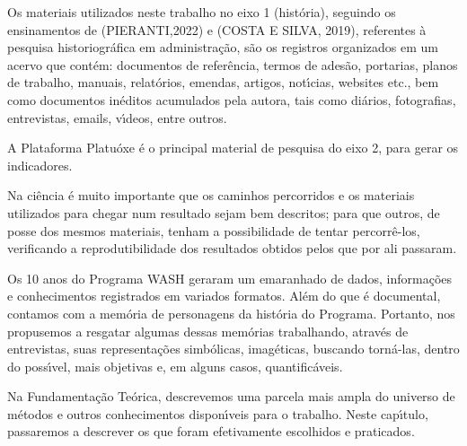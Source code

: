 \documentclass[
12pt,		%
openright,	%
twoside,  %
a4paper,			%
chapter=TITLE,		%
english,			%
french,				%
spanish,			%
brazil				%
]{USPSC-classe/USPSC}
\begin{document}
Os materiais utilizados neste trabalho no eixo 1 (hist\'oria), seguindo os ensinamentos de (PIERANTI,2022) e (COSTA E SILVA, 2019), referentes \`a pesquisa historiogr\'afica em administra\c{c}\~ao,  s\~ao os registros organizados em um acervo que cont\'em: documentos de refer\^encia, termos de ades\~ao, portarias, planos de trabalho, manuais, relat\'orios, emendas, artigos, not\'{\i}cias, websites etc., bem como documentos in\'editos acumulados pela autora, tais como di\'arios, fotografias, entrevistas, emails, v\'{\i}deos, entre outros.









A Plataforma Platu\'oxe \'e o principal material de pesquisa do eixo 2, para gerar os indicadores.









Na ci\^encia \'e muito importante que os caminhos percorridos e os materiais utilizados para chegar num resultado sejam bem descritos; para que outros, de posse dos mesmos materiais, tenham a possibilidade de tentar percorr\^e-los, verificando a reprodutibilidade dos resultados obtidos pelos que por ali passaram.









Os 10 anos do Programa WASH geraram um emaranhado de dados, informa\c{c}\~oes e conhecimentos registrados em variados formatos. Al\'em do que \'e documental, contamos com a mem\'oria de personagens da hist\'oria do Programa. Portanto, nos propusemos a resgatar algumas dessas mem\'orias trabalhando, atrav\'es de entrevistas, suas representa\c{c}\~oes simb\'olicas, imag\'eticas, buscando torn\'a-las, dentro do poss\'{\i}vel, mais objetivas e, em alguns casos, quantific\'aveis.









Na Fundamenta\c{c}\~ao Te\'orica, descrevemos uma parcela mais ampla do universo de m\'etodos e outros conhecimentos dispon\'{\i}veis para o trabalho. Neste cap\'{\i}tulo, passaremos a descrever os que foram efetivamente escolhidos e praticados.
\end{document}
